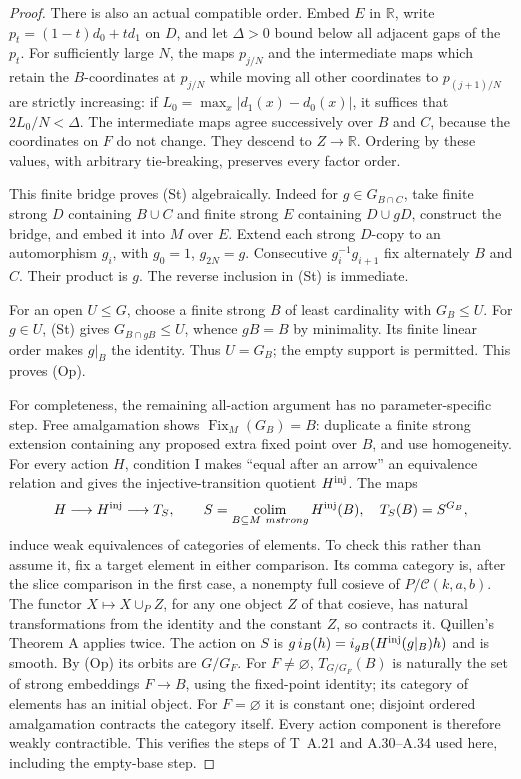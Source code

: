 \begin{proof}
There is also an actual compatible order. Embed $E$ in $\mathbb R$,
write $p_t=(1-t)d_0+td_1$ on $D$, and let $\Delta>0$ bound below
all adjacent gaps of the $p_t$. For sufficiently large $N$, the maps
$p_{j/N}$ and the intermediate maps which retain the $B$-coordinates
at $p_{j/N}$ while moving all other coordinates to $p_{(j+1)/N}$
are strictly increasing: if
$L_0=\max_x|d_1(x)-d_0(x)|$, it suffices that
$2L_0/N<\Delta$. The intermediate maps agree successively over
$B$ and $C$, because the coordinates on $F$ do not change.
They descend to $Z\to\mathbb R$. Ordering by these values, with
arbitrary tie-breaking, preserves every factor order.

This finite bridge proves (St) algebraically. Indeed for
$g\in G_{B\cap C}$, take finite strong $D$ containing $B\cup C$
and finite strong $E$ containing $D\cup gD$, construct the bridge,
and embed it into $M$ over $E$. Extend each strong $D$-copy to an
automorphism $g_i$, with $g_0=1$, $g_{2N}=g$. Consecutive
$g_i^{-1}g_{i+1}$ fix alternately $B$ and $C$. Their product is $g$.
The reverse inclusion in (St) is immediate.

For an open $U\leq G$, choose a finite strong $B$ of least cardinality
with $G_B\leq U$. For $g\in U$, (St) gives
$G_{B\cap gB}\leq U$, whence $gB=B$ by minimality.
Its finite linear order makes $g|_B$ the identity. Thus $U=G_B$;
the empty support is permitted. This proves (Op).

For completeness, the remaining all-action argument has no
parameter-specific step. Free amalgamation shows
$\operatorname{Fix}_M(G_B)=B$: duplicate a finite strong extension
containing any proposed extra fixed point over $B$, and use homogeneity.
For every action $H$, condition I makes ``equal after an arrow'' an
equivalence relation and gives the injective-transition quotient
$H^{\rm inj}$. The maps
\[
 H\longrightarrow H^{\rm inj}\longrightarrow T_S,
 \qquad
 S=\mathop{\rm colim}_{B\subseteq M\ {
m strong}}H^{\rm inj}(B),
 \quad T_S(B)=S^{G_B},
\]
induce weak equivalences of categories of elements. To check this
rather than assume it, fix a target element in either comparison.
Its comma category is, after the slice comparison in the first case,
a nonempty full cosieve of $P/\mathcal C(k,a,b)$. The functor
$X\mapsto X\cup_P Z$, for any one object $Z$ of that cosieve,
has natural transformations from the identity and the constant $Z$,
so contracts it. Quillen's Theorem A applies twice. The action on
$S$ is $g\,i_B(h)=i_{gB}(H^{\rm inj}(g|_B)h)$ and is smooth.
By (Op) its orbits are $G/G_F$. For $F\ne\varnothing$,
$T_{G/G_F}(B)$ is naturally the set of strong embeddings $F\to B$,
using the fixed-point identity; its category of elements has an
initial object. For $F=\varnothing$ it is constant one; disjoint
ordered amalgamation contracts the category itself. Every action
component is therefore weakly contractible. This verifies the steps
of T~A.21 and A.30--A.34 used here, including the empty-base step.
\end{proof}

